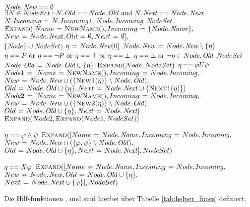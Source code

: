 \begin{codebox}
\li \If $\attrib{Node}{New}\isequal\emptyset$ \Then
\li \If $\exists N\in NodeSet: \attrib{N}{Old}\isequal\attrib{Node}{Old} \mbox{ and } \attrib{N}{Next}\isequal\attrib{Node}{Next}$ \Then
\li $\attrib{N}{Incoming}\gets \attrib{N}{Incoming}\cup\attrib{Node}{Incoming}$
\li \Return $NodeSet$
\li \Else \Return $\proc{Expand}([Name\gets \proc{NewName}(),Incoming\gets \{\attrib{Node}{Name}\},$
\Startalign{\Return $\proc{Expand}([$}
\> $New\gets\attrib{Node}{Next}, Old\gets\emptyset, Next\gets\emptyset],$\\
\> $\{Node\}\cup NodeSet)$
\Stopalign
\li \Else
\li $\eta\gets \attrib{Node}{New}[0]$
\li $\attrib{Node}{New}\gets\attrib{Node}{New}\setminus\{\eta\}$
\li \If $\eta\isequal P\mbox{ or }\eta\isequal\lnot P\mbox{ or }\eta\isequal\top\mbox{ or }\eta\isequal\bot$ \Then
\li \If $\eta\isequal\bot\mbox{ or }\lnot\eta\in\attrib{Node}{Old}$
\li \Then \Return $NodeSet$
\li \Else
\li $\attrib{Node}{Old}\gets \attrib{Node}{Old}\cup\{\eta\}$
\li \Return $\textnormal{\scshape Expand}(Node,NodeSet)$
\End
\li \ElseIf $\eta\isequal\varphi U\psi$ \Then
\li $Node1\gets [Name\gets\proc{NewName}(),Incoming\gets\attrib{Node}{Incoming},$
\Startalign{$Node1\gets [$}
\> $New\gets\attrib{Node}{New}\cup(\{\proc{New1}(\eta)\}\setminus\attrib{Node}{Old}),$\\
\> $Old\gets\attrib{Node}{Old}\cup\{\eta\},Next\gets\attrib{Node}{Next}\cup\{\proc{Next1}(\eta)\}]$
\Stopalign
\li $Node2\gets [Name\gets\proc{NewName}(),Incoming\gets\attrib{Node}{Incoming},$
\Startalign{$Node2\gets [$}
\> $New\gets\attrib{Node}{New}\cup(\{\proc{New2}(\eta)\}\setminus\attrib{Node}{Old}),$\\
\> $Old\gets\attrib{Node}{Old}\cup\{\eta\},Next\gets\attrib{Node}{Next} ]$
\Stopalign
\li \Return $\textnormal{\scshape Expand}(Node2,\textnormal{\scshape Expand}(Node1,NodeSet))$

\li \ElseIf $\eta\isequal\varphi\land\psi$\Then
\li \Return $\proc{Expand}([Name\gets\attrib{Node}{Name},Incoming\gets\attrib{Node}{Incoming},$
\Startalign{\Return $\proc{Expand}([$}
\> $New\gets\attrib{Node}{New}\cup(\{\varphi,\psi\}\setminus\attrib{Node}{Old}),$\\
\> $Old\gets\attrib{Node}{Old}\cup\{\eta\},Next\gets\attrib{Node}{Next}],NodeSet)$
\Stopalign

\li \ElseIf $\eta\isequal X\varphi$ \Then
\li \Return $\proc{Expand}([Name\gets\attrib{Node}{Name},Incoming\gets\attrib{Node}{Incoming},$
\Startalign{\Return $\proc{Expand}([$}
\> $New\gets\attrib{Node}{New},Old\gets\attrib{Node}{Old}\cup\{\eta\},$\\
\> $Next\gets\attrib{Node}{Next}\cup\{\varphi\}],NodeSet)$
\Stopalign
\End
\End
\End
\end{codebox}
Die Hilfsfunktionen ,  und  sind hierbei über Tabelle \ref{tab:helper_funcs} definiert.

